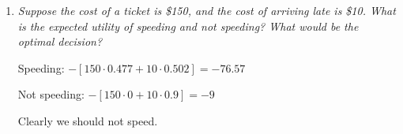 \documentclass{article}
\begin{document}
\begin{enumerate}[(a)]
\begin{enumerate}
    If the driver doesn't speed, we get
    $$P(Ticket=T,SC=F,S=F,ST=T)=P(Ticket=T|C=T,S=F,ST=T)P(C=T|SC=F,S=F,ST=T)+P(Ticket=T|C=F,S=F,ST=T)P(C=F|SC=F,S=F,ST=T)
      =0\cdot \cdot P(C=T|SC=F,S=T,ST=T)+0\cdot P(C=F|SC=F,S=T,ST=T)=0$$

  \item \textit{Suppose the cost of a ticket is \$150, and the cost of arriving 
    late is \$10. What is the expected utility of speeding and not speeding?
    What would be the optimal decision?}

   Speeding: $-\left[ 150\cdot 0.477 +10\cdot 0.502\right]=-76.57$ 

   Not speeding: $-\left[150\cdot 0+10\cdot 0.9\right]=-9$

   Clearly we should not speed. 
  \end{enumerate}
\end{enumerate}
\end{document}
